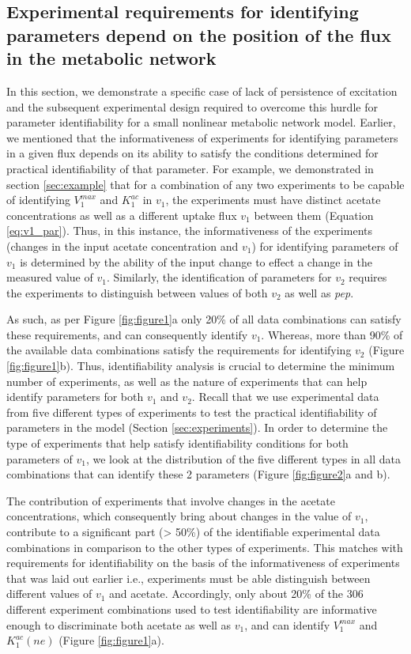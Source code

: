 \documentclass[10pt]{article}
\begin{document}
	\subsection{Experimental requirements for identifying parameters depend on the position of the flux in the metabolic network}\label{sec:experiment_type}	
	In this section, we demonstrate a specific case of lack of persistence of excitation and the subsequent experimental design required to overcome this hurdle for parameter identifiability for a small nonlinear metabolic network model. Earlier, we mentioned that the informativeness of experiments for identifying parameters in a given flux depends on its ability to satisfy the conditions determined for practical identifiability of that parameter. For example, we demonstrated in section \ref{sec:example} that for a combination of any two experiments to be capable of identifying $V_1^{max}$ and $K_1^{ac}$ in $v_1$, the experiments must have distinct acetate concentrations as well as a different uptake flux $v_1$ between them (Equation \ref{eq:v1_par}). Thus, in this instance, the informativeness of the experiments (changes in the input acetate concentration and $v_1$) for identifying parameters of $v_1$ is determined by the ability of the input change to effect a change in the measured value of $v_1$. Similarly, the identification of parameters for $v_2$ requires the experiments to distinguish between values of both $v_2$ as well as \textit{pep}. %
	
	As such, as per Figure \ref{fig:figure1}a only 20\% of all data combinations can satisfy these requirements, and can consequently identify $v_1$. Whereas, more than 90\% of the available data combinations satisfy the requirements for identifying $v_2$ (Figure \ref{fig:figure1}b). Thus, identifiability analysis is crucial to determine the minimum number of experiments, as well as the nature of experiments that can help identify parameters for both $v_1$ and $v_2$. Recall that we use experimental data from five different types of experiments to test the practical identifiability of parameters in the model (Section \ref{sec:experiments}).
	In order to determine the type of experiments that help satisfy identifiability conditions for both parameters of $v_1$, we look at the distribution of the five different types in all data combinations that can identify these 2 parameters (Figure \ref{fig:figure2}a and b).	
	
	The contribution of experiments that involve changes in the acetate concentrations, which consequently bring about changes in the value of $v_1$, contribute to a significant part (> 50\%) of the identifiable experimental data combinations in comparison to the other types of experiments. This matches with requirements for identifiability on the basis of the informativeness of experiments that was laid out earlier i.e., experiments must be able distinguish between different values of $v_1$ and acetate. Accordingly, only about 20\% of the 306 different experiment combinations used to test identifiability are informative enough to discriminate both acetate as well as $v_1$, and can identify $V_1^{max}$ and $K_1^{ac}(ne)$ (Figure \ref{fig:figure1}a). 	
	
\end{document}
